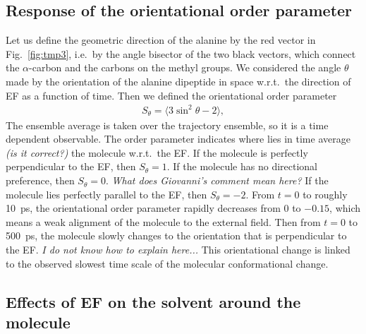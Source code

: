 \documentclass[a4paper,preprint,unsortedaddress,onecolumn]{revtex4-1}
\newcommand{\bluec}[1]{{\color{blue} #1}}
\begin{document}
\subsection{Response of the orientational order parameter}

Let us define
the geometric direction of the alanine by the red vector in
Fig.~\ref{fig:tmp3}, i.e.~by the angle bisector of the two black vectors,
which connect the $\alpha$-carbon and the carbons
on the methyl groups. 
We considered the angle $\theta$ made by 
the orientation of the alanine dipeptide in space w.r.t.~the direction of EF
as a function of time.
Then we defined the orientational order parameter 
\begin{align}
  S_\theta = \langle 3\sin^2\theta - 2\rangle,
\end{align}
The ensemble average is taken over the trajectory ensemble, so it is
a time dependent observable.
The order parameter
indicates where lies \bluec{in time average \textit{(is it correct?)}} the molecule w.r.t.~the EF.
If the molecule is perfectly perpendicular to the EF, then $S_\theta = 1$.
If the molecule has no directional
preference, then $S_\theta = 0$. \bluec{\textit{What does Giovanni's comment mean here?}}
If the molecule lies perfectly parallel to the EF, then $S_\theta = -2$.
From $t=0$ to roughly 10~ps, the orientational order parameter rapidly
decreases from 0 to $-0.15$, which means a weak alignment of the molecule to the external field.
Then from $t=0$ to 500~ps, the molecule slowly changes to the orientation
that is perpendicular to the EF. \bluec{\textit{I do not know how to explain here...}}
This orientational change is linked to the observed slowest
time scale of the molecular conformational change.


\subsection{Effects of EF on the solvent around the molecule}
\end{document}

